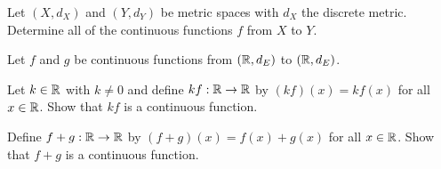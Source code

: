 Let $(X,d_X)$ and $(Y, d_Y)$ be metric spaces with $d_X$ the discrete metric. Determine all of the continuous functions $f$ from $X$ to $Y$. 

\begin{comment}

\ExerciseSolution We will prove that any function $f: X \to Y$ is continuous. Let $f: X \to Y$ be a function and let $a \in X$. Let $\epsilon$ be a positive real number and let $\delta = 1$. For any $x \in X$ with $d_X(x,a) < \delta$, it must be the case that $x = a$. It follows that $d_Y(f(x),f(a)) = d_Y(f(a),f(a)) = 0 < \epsilon$. So $f$ is continuous at every point in $X$ and $f$ is a continuous function.  

\end{comment}

\item \label{ex:sum_continuous} Let $f$ and $g$ be continuous functions from $(\mathbb{R},d_E)$ to $(\mathbb{R}, d_E)$. 
	\ba
	\item Let $k \in \mathbb{R}$ with $k \neq 0$ and define $kf : \mathbb{R} \to \mathbb{R}$ by $(kf)(x) = kf(x)$ for all $x \in \mathbb{R}$. Show that $kf$ is a continuous function.
	
	
	\item Define $f+g : \mathbb{R} \to \mathbb{R}$ by $(f+g)(x) = f(x) + g(x)$ for all $x \in \mathbb{R}$. Show that $f+g$ is a continuous function.
	
	\ea
	
\begin{comment}

\ExerciseSolution

\ba

\item Let $\epsilon > 0$ be given and let $a \in \R$. Since $f$ is continuous at $a$ there is a $\delta > 0$ such that $d_E(f(x),f(a)) < \frac{\epsilon}{|k|}$ whenever $d_E(x,a) < \delta$. Then
\[d_E((kf)(x), (kf)(a)) = d_E(kf(x), kf(a)) = |kf(x)-kf(a)| = |k||f(x)-f(a)| < |k|\ \frac{\epsilon}{k} = \epsilon\]
whenever $d_E(x,a) < \delta$. We conclude that $kf$ is continuous at every $a \in \R$ and so $kf$ is a continuous function. 


\item Let $\epsilon$ be greater than $0$ and let $a \in \R$. Since $f$ is continuous at $a$, there exists $\delta_f > 0$ such that $d_E(f(x),f(a)) < \frac{\epsilon}{2}$ whenever $d_E(x,a) < \delta_f$. Similarly, since $g$ is continuous at $a$, there exists $\delta_g > 0$ such that $d_E(g(x),g(a)) < \frac{\epsilon}{2}$ whenever $d_E(x, a) < \delta_g$. Let $\delta = \min\left\{\delta_f, \delta_g\right\}$. Now suppose that $d_E(x,a) < \delta$. Then 
\begin{align*}
d_E((f+g)(x), (f+g)(a)) &= d_E(f(x)+g(x), f(a) + g(a)) \\
	&= |f(x)-f(a) + g(x)-g(a)| \\
	&\leq |f(x)-f(a)| + |g(x)-g(a)| \\
	&= d_E(f(x),f(a)) + d_E(g(x), g(a)) \\
	< \frac{\epsilon}{2} + \frac{\epsilon}{2} \\
	&= \epsilon.
\end{align*}
Thus, $f+g$ is a continuous function.

\end{comment}

